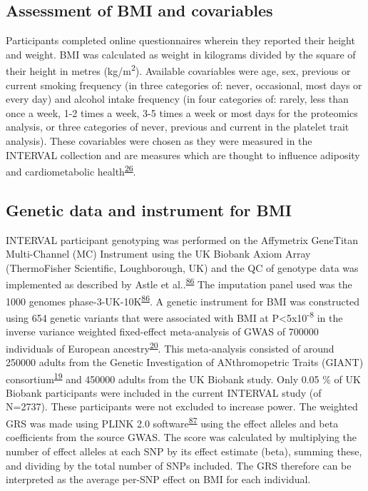 \documentclass[11pt,twoside]{bristolthesis}
\begin{document}
\hypertarget{assessment-of-bmi-and-covariables}{%
\subsection{Assessment of BMI and covariables}\label{assessment-of-bmi-and-covariables}}

Participants completed online questionnaires wherein they reported their height and weight. BMI was calculated as weight in kilograms divided by the square of their height in metres (kg/m\textsuperscript{2}). Available covariables were age, sex, previous or current smoking frequency (in three categories of: never, occasional, most days or every day) and alcohol intake frequency (in four categories of: rarely, less than once a week, 1-2 times a week, 3-5 times a week or most days for the proteomics analysis, or three categories of never, previous and current in the platelet trait analysis). These covariables were chosen as they were measured in the INTERVAL collection and are measures which are thought to influence adiposity and cardiometabolic health\textsuperscript{\protect\hyperlink{ref-Bell2018a}{26}}.

\hypertarget{genetic-data-and-instrument-for-bmi}{%
\subsection{Genetic data and instrument for BMI}\label{genetic-data-and-instrument-for-bmi}}

INTERVAL participant genotyping was performed on the Affymetrix GeneTitan Multi-Channel (MC) Instrument using the UK Biobank Axiom Array (ThermoFisher Scientific, Loughborough, UK) and the QC of genotype data was implemented as described by Astle et al..\textsuperscript{\protect\hyperlink{ref-Astle2016}{86}} The imputation panel used was the 1000 genomes phase-3-UK-10K\textsuperscript{\protect\hyperlink{ref-Astle2016}{86}}. A genetic instrument for BMI was constructed using 654 genetic variants that were associated with BMI at P\textless5x10\textsuperscript{-8} in the inverse variance weighted fixed-effect meta-analysis of GWAS of 700000 individuals of European ancestry\textsuperscript{\protect\hyperlink{ref-Yengo2018}{20}}. This meta-analysis consisted of around 250000 adults from the Genetic Investigation of ANthromopetric Traits (GIANT) consortium\textsuperscript{\protect\hyperlink{ref-Locke2015}{19}} and 450000 adults from the UK Biobank study. Only 0.05 \% of UK Biobank participants were included in the current INTERVAL study (of N=2737). These participants were not excluded to increase power. The weighted GRS was made using PLINK 2.0 software\textsuperscript{\protect\hyperlink{ref-Purcell2007a}{87}} using the effect alleles and beta coefficients from the source GWAS. The score was calculated by multiplying the number of effect alleles at each SNP by its effect estimate (beta), summing these, and dividing by the total number of SNPs included. The GRS therefore can be interpreted as the average per-SNP effect on BMI for each individual.
\end{document}
